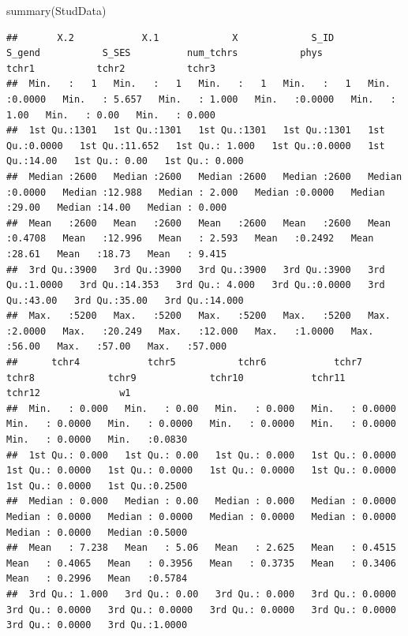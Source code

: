 \documentclass[
]{book}
\newenvironment{Shaded}{\begin{snugshade}}{\end{snugshade}}
\newcommand{\FunctionTok}[1]{\textcolor[rgb]{0.00,0.00,0.00}{#1}}
\newcommand{\NormalTok}[1]{#1}
\begin{document}
\begin{Shaded}
\begin{Highlighting}[]
\FunctionTok{summary}\NormalTok{(StudData)}
\end{Highlighting}
\end{Shaded}

\begin{verbatim}
##       X.2            X.1             X             S_ID          S_gend           S_SES          num_tchrs           phys            tchr1           tchr2           tchr3       
##  Min.   :   1   Min.   :   1   Min.   :   1   Min.   :   1   Min.   :0.0000   Min.   : 5.657   Min.   : 1.000   Min.   :0.0000   Min.   : 1.00   Min.   : 0.00   Min.   : 0.000  
##  1st Qu.:1301   1st Qu.:1301   1st Qu.:1301   1st Qu.:1301   1st Qu.:0.0000   1st Qu.:11.652   1st Qu.: 1.000   1st Qu.:0.0000   1st Qu.:14.00   1st Qu.: 0.00   1st Qu.: 0.000  
##  Median :2600   Median :2600   Median :2600   Median :2600   Median :0.0000   Median :12.988   Median : 2.000   Median :0.0000   Median :29.00   Median :14.00   Median : 0.000  
##  Mean   :2600   Mean   :2600   Mean   :2600   Mean   :2600   Mean   :0.4708   Mean   :12.996   Mean   : 2.593   Mean   :0.2492   Mean   :28.61   Mean   :18.73   Mean   : 9.415  
##  3rd Qu.:3900   3rd Qu.:3900   3rd Qu.:3900   3rd Qu.:3900   3rd Qu.:1.0000   3rd Qu.:14.353   3rd Qu.: 4.000   3rd Qu.:0.0000   3rd Qu.:43.00   3rd Qu.:35.00   3rd Qu.:14.000  
##  Max.   :5200   Max.   :5200   Max.   :5200   Max.   :5200   Max.   :2.0000   Max.   :20.249   Max.   :12.000   Max.   :1.0000   Max.   :56.00   Max.   :57.00   Max.   :57.000  
##      tchr4            tchr5           tchr6            tchr7             tchr8             tchr9             tchr10            tchr11            tchr12              w1        
##  Min.   : 0.000   Min.   : 0.00   Min.   : 0.000   Min.   : 0.0000   Min.   : 0.0000   Min.   : 0.0000   Min.   : 0.0000   Min.   : 0.0000   Min.   : 0.0000   Min.   :0.0830  
##  1st Qu.: 0.000   1st Qu.: 0.00   1st Qu.: 0.000   1st Qu.: 0.0000   1st Qu.: 0.0000   1st Qu.: 0.0000   1st Qu.: 0.0000   1st Qu.: 0.0000   1st Qu.: 0.0000   1st Qu.:0.2500  
##  Median : 0.000   Median : 0.00   Median : 0.000   Median : 0.0000   Median : 0.0000   Median : 0.0000   Median : 0.0000   Median : 0.0000   Median : 0.0000   Median :0.5000  
##  Mean   : 7.238   Mean   : 5.06   Mean   : 2.625   Mean   : 0.4515   Mean   : 0.4065   Mean   : 0.3956   Mean   : 0.3735   Mean   : 0.3406   Mean   : 0.2996   Mean   :0.5784  
##  3rd Qu.: 1.000   3rd Qu.: 0.00   3rd Qu.: 0.000   3rd Qu.: 0.0000   3rd Qu.: 0.0000   3rd Qu.: 0.0000   3rd Qu.: 0.0000   3rd Qu.: 0.0000   3rd Qu.: 0.0000   3rd Qu.:1.0000  

\end{verbatim}
\end{document}
